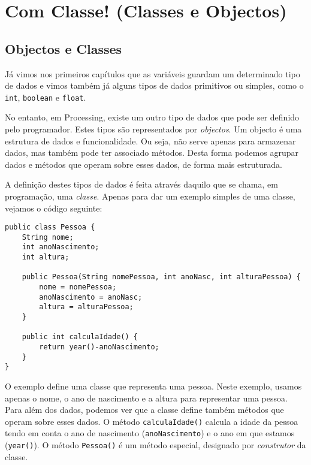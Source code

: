\chapter{Com Classe! (Classes e Objectos)}

\section{Objectos e Classes}
Já vimos nos primeiros capítulos que as variáveis guardam um determinado tipo de dados e vimos também já alguns tipos de dados primitivos ou simples, como o \texttt{int}, \texttt{boolean} e \texttt{float}.

No entanto, em Processing, existe um outro tipo de dados que pode ser definido pelo programador. Estes tipos são representados por \emph{objectos}. Um objecto é uma estrutura de dados e funcionalidade. Ou seja, não serve apenas para armazenar dados, mas também pode ter associado métodos. Desta forma podemos agrupar dados e métodos que operam sobre esses dados, de forma mais estruturada.

A definição destes tipos de dados é feita através daquilo que se chama, em programação, uma \emph{classe}. 
Apenas para dar um exemplo simples de uma classe, vejamos o código seguinte:
\begin{lstlisting}
public class Pessoa {
    String nome;
    int anoNascimento;
    int altura;
    
    public Pessoa(String nomePessoa, int anoNasc, int alturaPessoa) {
        nome = nomePessoa;
        anoNascimento = anoNasc;
        altura = alturaPessoa;
    }
    
    public int calculaIdade() {
        return year()-anoNascimento;
    }   
}
\end{lstlisting}


O exemplo define uma classe que representa uma pessoa. Neste exemplo, usamos apenas o nome, o ano de nascimento e a altura para representar uma pessoa. Para além dos dados, podemos ver que a classe define também métodos que operam sobre esses dados. O método \texttt{calculaIdade()} calcula a idade da pessoa tendo em conta o ano de nascimento (\texttt{anoNascimento}) e o ano em que estamos (\texttt{year()}). O método \texttt{Pessoa()} é um método especial, designado por \emph{construtor} da classe.

